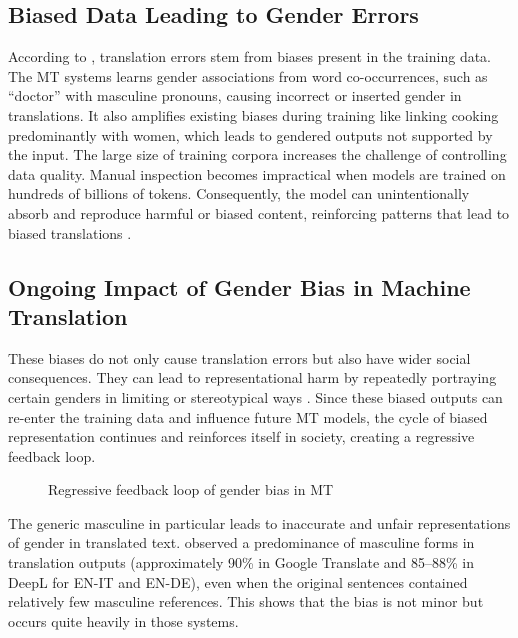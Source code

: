         \subsection{Biased Data Leading to Gender Errors}
        According to \textcite{ullmannGenderBiasMachine2022}, translation errors stem from biases present in the training data. The MT systems learns gender associations from word co-occurrences, such as “doctor” with masculine pronouns, causing incorrect or inserted gender in translations. It also amplifies existing biases during training like linking cooking predominantly with women, which leads to gendered outputs not supported by the input. The large size of training corpora increases the challenge of controlling data quality. Manual inspection becomes impractical when models are trained on hundreds of billions of tokens. Consequently, the model can unintentionally absorb and reproduce harmful or biased content, reinforcing patterns that lead to biased translations \citep{ullmannGenderBiasMachine2022}.

    \subsection{Ongoing Impact of Gender Bias in Machine Translation}
        These biases do not only cause translation errors but also have wider social consequences. They can lead to representational harm by repeatedly portraying certain genders in limiting or stereotypical ways \parencite{stanczakSurveyGenderBias2021}. Since these biased outputs can re-enter the training data and influence future MT models, the cycle of biased representation continues and reinforces itself in society, creating a regressive feedback loop.

        \vspace{0.8em} 
        \begin{figure}[htb]
            \centering
            \scalebox{0.8}{}
            \caption{Regressive feedback loop of gender bias in MT}
            \label{fig:regressive_feedback_loop}
        \end{figure}
        \vspace{0.8em} 

        The generic masculine in particular leads to inaccurate and unfair representations of gender in translated text. \textcite{rescignoGenderBiasMachine2023} observed a predominance of masculine forms in translation outputs (approximately 90\% in Google Translate and 85–88\% in DeepL for EN-IT and EN-DE), even when the original sentences contained relatively few masculine references. This shows that the bias is not minor but occurs quite heavily in those systems.

